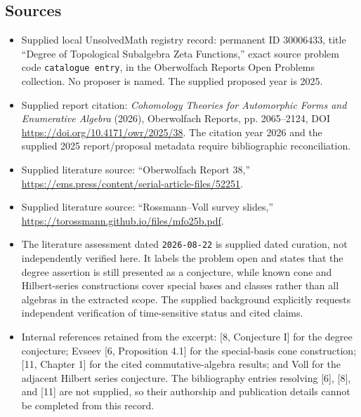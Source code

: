 \documentclass[11pt]{article}
\begin{document}
\subsection{Sources}
\begin{itemize}
\item Supplied local UnsolvedMath registry record: permanent ID \(30006433\), title ``Degree of Topological Subalgebra Zeta Functions,'' exact source problem code \texttt{catalogue entry}, in the Oberwolfach Reports Open Problems collection. No proposer is named. The supplied proposed year is 2025.
\item Supplied report citation: \emph{Cohomology Theories for Automorphic Forms and Enumerative Algebra} (2026), Oberwolfach Reports, pp. 2065--2124, DOI \url{https://doi.org/10.4171/owr/2025/38}. The citation year 2026 and the supplied 2025 report/proposal metadata require bibliographic reconciliation.
\item Supplied literature source: ``Oberwolfach Report 38,'' \url{https://ems.press/content/serial-article-files/52251}.
\item Supplied literature source: ``Rossmann--Voll survey slides,'' \url{https://torossmann.github.io/files/mfo25b.pdf}.
\item The literature assessment dated \texttt{2026-08-22} is supplied dated curation, not independently verified here. It labels the problem open and states that the degree assertion is still presented as a conjecture, while known cone and Hilbert-series constructions cover special bases and classes rather than all algebras in the extracted scope. The supplied background explicitly requests independent verification of time-sensitive status and cited claims.
\item Internal references retained from the excerpt: [8, Conjecture I] for the degree conjecture; Evseev [6, Proposition 4.1] for the special-basis cone construction; [11, Chapter 1] for the cited commutative-algebra results; and Voll for the adjacent Hilbert series conjecture. The bibliography entries resolving [6], [8], and [11] are not supplied, so their authorship and publication details cannot be completed from this record.
\end{itemize}
\end{document}
